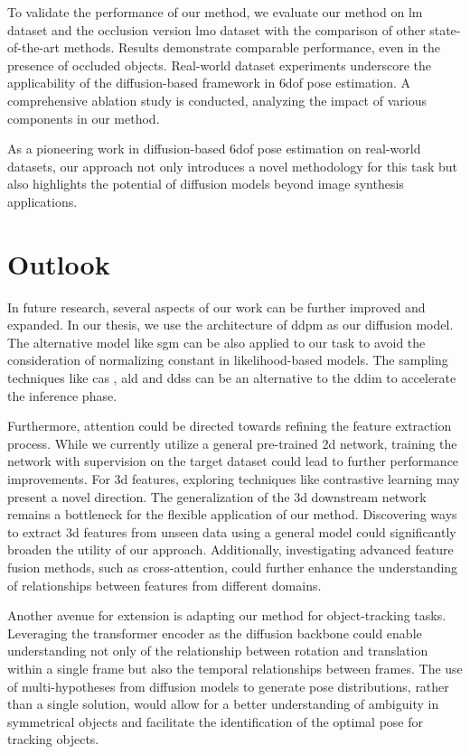 \documentclass[12pt,DIV14,BCOR12mm,a4paper,footinclude=false,headinclude,parskip=half-,twoside,openright,cleardoublepage=empty,toc=index,bibliography=totoc,listof=totoc]{scrreprt}
\numberwithin{equation}{chapter}
\begin{document}
To validate the performance of our method, we evaluate our method on \gls{lm} \cite{hinterstoisser2012model} dataset and the occlusion version \gls{lmo} \cite{dataV4MUMX2020} dataset with the comparison of other state-of-the-art methods. Results demonstrate comparable performance, even in the presence of occluded objects. Real-world dataset experiments underscore the applicability of the diffusion-based framework in \gls{6dof} pose estimation. A comprehensive ablation study is conducted, analyzing the impact of various components in our method.

As a pioneering work in diffusion-based \gls{6dof} pose estimation on real-world datasets, our approach not only introduces a novel methodology for this task but also highlights the potential of diffusion models beyond image synthesis applications.

\section{Outlook}
In future research, several aspects of our work can be further improved and expanded. In our thesis, we use the architecture of \gls{ddpm} as our diffusion model. The alternative model like \gls{sgm} \cite{song2020generative,song2020improved} can be also applied to our task to avoid the consideration of normalizing constant in likelihood-based models. The sampling techniques like \gls{cas} \cite{jolicoeurmartineau2020adversarial}, \gls{ald} \cite{dockhorn2022scorebased} and \gls{ddss} \cite{watson2022learning} can be an alternative to the \gls{ddim} to accelerate the inference phase.

Furthermore, attention could be directed towards refining the feature extraction process. While we currently utilize a general pre-trained \gls{2d} network, training the network with supervision on the target dataset could lead to further performance improvements. For \gls{3d} features, exploring techniques like contrastive learning may present a novel direction. The generalization of the \gls{3d} downstream network remains a bottleneck for the flexible application of our method. Discovering ways to extract \gls{3d} features from unseen data using a general model could significantly broaden the utility of our approach. Additionally, investigating advanced feature fusion methods, such as cross-attention, could further enhance the understanding of relationships between features from different domains.

Another avenue for extension is adapting our method for object-tracking tasks. Leveraging the transformer encoder as the diffusion backbone could enable understanding not only of the relationship between rotation and translation within a single frame but also the temporal relationships between frames. The use of multi-hypotheses from diffusion models to generate pose distributions, rather than a single solution, would allow for a better understanding of ambiguity in symmetrical objects and facilitate the identification of the optimal pose for tracking objects.
\end{document}
